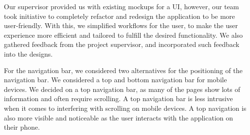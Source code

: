 \documentclass[12pt, titlepage]{article}
\begin{document}
\begin{enumerate}
	      Our supervisor provided us with existing mockups for a UI, however, our team took initiative to
	      completely refactor and redesign the application to be more user-friendly. With this, we simplified
	      workflows for the user, to make the user experience more efficient and tailored to fulfill the
	      desired functionality. We also gathered feedback from the project supervisor, and incorporated such
	      feedback into the designs.

	      For the navigation bar, we considered two alternatives for the positioning of the navigation bar.
	      We considered a top and bottom navigation bar for mobile devices. We decided on a top navigation
	      bar, as many of the pages show lots of information and often require scrolling. A top navigation
	      bar is less intrusive when it comes to interfering with scrolling on mobile devices. A top
	      navigation is also more visible and noticeable as the user interacts with the application on their
	      phone.

\end{enumerate}
\end{document}
